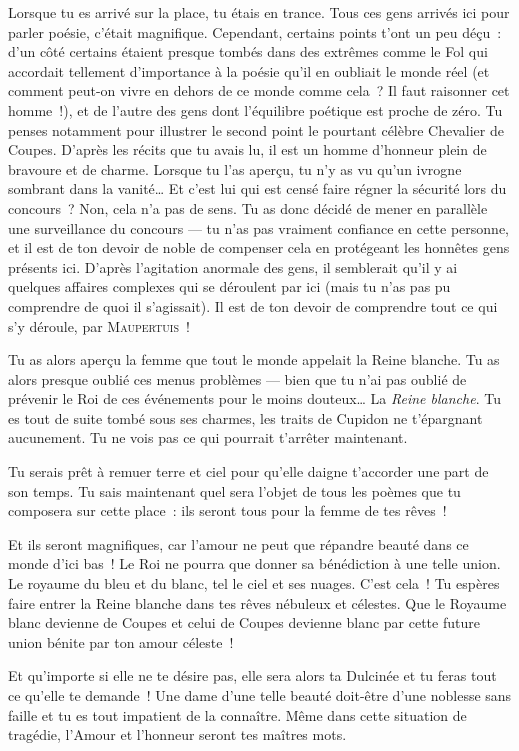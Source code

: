 {{Lorsque tu es arrivé sur la place, tu étais en trance.
Tous ces gens arrivés ici pour parler poésie, c’était magnifique.
Cependant, certains points t’ont un peu déçu~:  d’un côté certains étaient presque tombés dans des extrêmes comme le Fol qui accordait tellement d’importance à la poésie qu’il en oubliait le monde réel (et comment peut-on vivre en dehors de ce monde comme cela~?  Il faut raisonner cet homme~!), et de l’autre des gens dont l’équilibre poétique est proche de zéro.
Tu penses notamment pour illustrer le second point le pourtant célèbre Chevalier de Coupes.
D’après les récits que tu avais lu, il est un homme d’honneur plein de bravoure et de charme.
Lorsque tu l’as aperçu, tu n’y as vu qu’un ivrogne sombrant dans la vanité…
Et c’est lui qui est censé faire régner la sécurité lors du concours~?  Non, cela n’a pas de sens.
Tu as donc décidé de mener en parallèle une surveillance du concours — tu n’as pas vraiment confiance en cette personne, et il est de ton devoir de noble de compenser cela en protégeant les honnêtes gens présents ici.
D’après l’agitation anormale des gens, il semblerait qu’il y ai quelques affaires complexes qui se déroulent par ici (mais tu n’as pas pu comprendre de quoi il s’agissait).
Il est de ton devoir de comprendre tout ce qui s’y déroule, par \textsc{Maupertuis}~!

Tu as alors aperçu la femme que tout le monde appelait la Reine blanche.
Tu as alors presque oublié ces menus problèmes — bien que tu n’ai pas oublié de prévenir le Roi de ces événements pour le moins douteux…
La \emph{Reine blanche}.
Tu es tout de suite tombé sous ses charmes, les traits de Cupidon ne t’épargnant aucunement.
Tu ne vois pas ce qui pourrait t’arrêter maintenant.

Tu serais prêt à remuer terre et ciel pour qu’elle daigne t’accorder une part de son temps.
Tu sais maintenant quel sera l’objet de tous les poèmes que tu composera sur cette place~:
ils seront tous pour la femme de tes rêves~!

Et ils seront magnifiques, car l’amour ne peut que répandre beauté dans ce monde d’ici bas~!
Le Roi ne pourra que donner sa bénédiction à une telle union.
Le royaume du bleu et du blanc, tel le ciel et ses nuages.
C’est cela~!  Tu espères faire entrer la Reine blanche dans tes rêves nébuleux et célestes.
Que le Royaume blanc devienne de Coupes et celui de Coupes devienne blanc par cette future union bénite par ton amour céleste~!

Et qu’importe si elle ne te désire pas, elle sera alors ta Dulcinée et tu feras tout ce qu’elle te demande~!
Une dame d’une telle beauté doit-être d’une noblesse sans faille et tu es tout impatient de la connaître.
Même dans cette situation de tragédie, l’Amour et l’honneur seront tes maîtres mots.

}}
